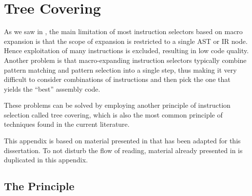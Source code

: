 %

\chapter{Tree Covering}


As we saw in , the main limitation of most
\glspl{instruction selector} based on \gls{macro expansion} is that the scope of
expansion is restricted to a single \gls{AST} or \gls{IR} \gls{node}.
%
Hence exploitation of many \glspl{instruction} is excluded, resulting in low
code quality.
%
Another problem is that \gls{macro}-expanding \glspl{instruction selector}
typically combine \gls{pattern matching} and \gls{pattern selection} into a
single step, thus making it very difficult to consider combinations of
\glspl{instruction} and then pick the one that yields the ``best'' \gls{assembly
  code}.

These problems can be solved by employing another \gls{principle} of
\gls{instruction selection} called \gls{tree covering}, which is also the most
common \gls{principle} of techniques found in the current literature.

This appendix is based on material presented in
\cite[Chap.]{HjortBlindell:2016:Survey} that has been adapted for
this dissertation.
%
To not disturb the flow of reading, material already presented in
 is duplicated in this appendix.


\section{The Principle}

